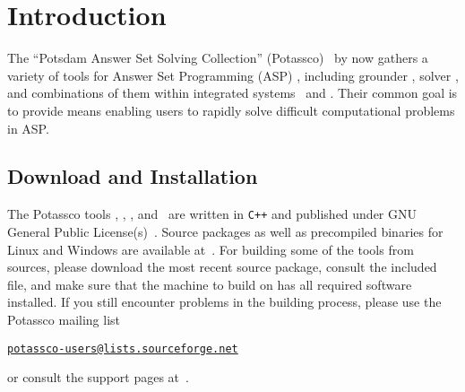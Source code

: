 \section{Introduction}\label{sec:introduction}

The ``Potsdam Answer Set Solving Collection'' (Potassco)~\cite{potassco}
by now gathers a variety of tools for Answer Set Programming (ASP)
\cite{ankolisc05a,baral03a,gelleo02a,lifschitz02a,martru99a,niemela99a},
including grounder \gringo, solver \clasp, and
combinations of them within integrated systems \clingo\ and \iclingo.
Their common goal is to provide means enabling users 
to rapidly solve difficult computational problems in ASP.

\subsection{Download and Installation}

The Potassco tools \gringo, \clasp, \clingo, and \iclingo\
are written in \texttt{C++} and published under GNU General Public License(s)~\cite{GNUgpl}.
Source packages as well as precompiled binaries for Linux and Windows
are available at~\cite{potassco}.
For building some of the tools from sources,
please download the most recent source package, consult the
included  %
file,
and make sure that the machine to build on has all
required software installed.
If you still encounter problems in the building process,
please use the Potassco mailing list 

\href{mailto:potassco-users@lists.sourceforge.net}{\texttt{potassco-users@lists.sourceforge.net}}

\noindent
or consult the support pages at~\cite{potassco}.

